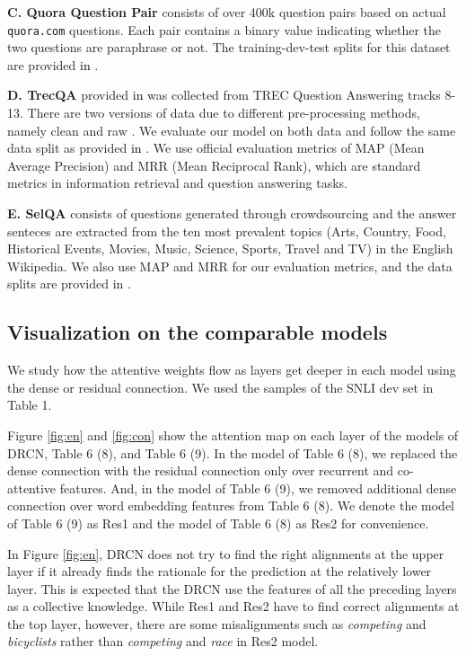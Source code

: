 \documentclass[letterpaper]{article} \usepackage{aaai19}  \usepackage{times}  \usepackage{helvet}  \usepackage{courier}  \usepackage{url}  \usepackage{graphicx}  \frenchspacing  \setlength{\pdfpagewidth}{8.5in}  \setlength{\pdfpageheight}{11in}
\newcommand\nj[1]{\textcolor{black}{#1}}
\begin{document}
\noindent  \textbf{C. Quora Question Pair} consists of over 400k question pairs based on actual \texttt{quora.com} questions. Each pair contains a binary value indicating whether the two questions are paraphrase or not. The training-dev-test splits for this dataset are provided \nj{in} \cite{wang2017bilateral}.

\noindent \textbf{D. TrecQA} provided \nj{in} \cite{wang2007jeopardy} was collected from TREC Question Answering tracks 8-13. There are two versions of data due to different pre-processing methods, namely clean and raw \cite{rao2016noise}. We evaluate our model on both data and follow the same data split as provided \nj{in} \cite{wang2007jeopardy}. We use official evaluation metrics of MAP (Mean Average Precision) and MRR (Mean Reciprocal Rank), which are standard metrics in information retrieval and question answering tasks.

\noindent \textbf{E. SelQA} consists of questions generated through crowdsourcing and the answer senteces are extracted from the ten most prevalent topics (Arts, Country, Food, Historical Events, Movies, Music, Science, Sports, Travel and TV) in the English Wikipedia. We also use MAP and MRR for our evaluation metrics, and the data splits are provided in \cite{jurczyk2016selqa}.

\newpage
\subsection{Visualization on the comparable models}


\label{sec:supplemental}
We study how the attentive weights flow as layers get deeper in each model using the dense or residual connection. We used the samples of the SNLI dev set in Table 1.

Figure \ref{fig:en} and \ref{fig:con} show the attention map on each layer of the models of DRCN, Table 6 (8), and Table 6 (9). In the model of Table 6 (8), we replaced the dense connection with the residual connection only over recurrent and co-attentive features. And, in the model of Table 6 (9), we removed additional dense connection over word embedding features from Table 6 (8). We denote the model of Table 6 (9) as Res1 and the model of Table 6 (8) as Res2 for convenience. 

In Figure \ref{fig:en}, DRCN does not try to find the right alignments at the upper layer if it already finds the rationale for the prediction at the relatively lower layer. This is expected that the DRCN use the features of all the preceding layers as a collective knowledge. While Res1 and Res2 have to find correct alignments at the top layer, however, there are some misalignments such as \textit{competing} and \textit{bicyclists} rather than \textit{competing} and \textit{race} in Res2 model.
\end{document}
